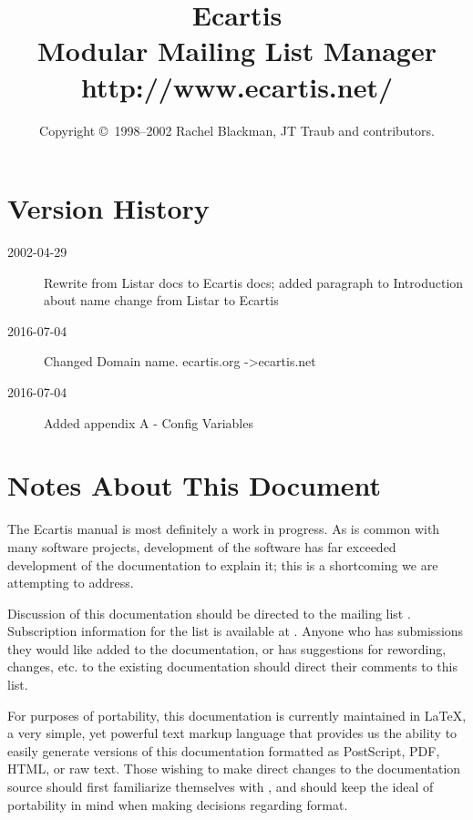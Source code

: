 \documentclass{book}
\begin{document}
\frontmatter

\title{Ecartis \\ Modular Mailing List Manager \\ http://www.ecartis.net/}
\author{Copyright \copyright\ 1998--2002 Rachel Blackman, JT Traub and contributors.}
\maketitle

\chapter{Version History}
\label{version}

\begin{description}
	\item[2002-04-29] Rewrite from Listar docs to Ecartis docs; added
                      paragraph to Introduction about name change from Listar
                      to Ecartis
	\item[2016-07-04] Changed Domain name. ecartis.org -\textgreater  ecartis.net
	\item[2016-07-04] Added appendix A - Config Variables
\end{description}

\chapter{Notes About This Document}

The Ecartis manual is most definitely a work in progress.  As is common with
many software projects, development of the software has far exceeded
development of the documentation to explain it; this is a shortcoming we are
attempting to address.  

Discussion of this documentation should be directed to the mailing list 
.  Subscription information for the list is
available at .  Anyone who has submissions they
would like added to the documentation, or has suggestions for rewording,
changes, etc. to the existing documentation should direct their comments to
this list.

For purposes of portability, this documentation is currently maintained in
\LaTeX, a very simple, yet powerful text markup language that provides us the
ability to easily generate versions of this documentation formatted as
PostScript, PDF, HTML, or raw text.  Those wishing to make direct changes to
the documentation source should first familiarize themselves with \LaTeXe,
and should keep the ideal of portability in mind when making decisions
regarding format.
\end{document}
